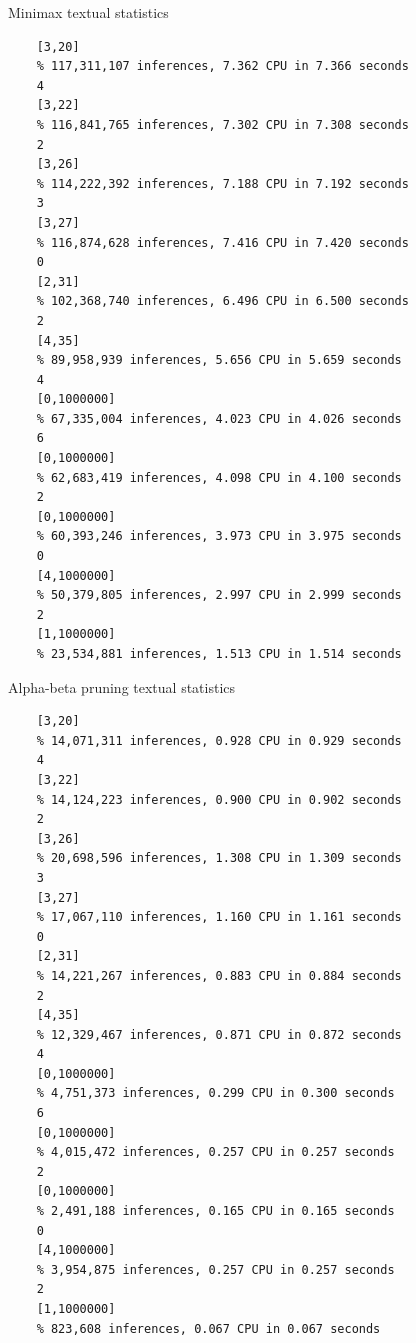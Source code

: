 \documentclass[11pt,a4paper]{article}
\begin{document}
Minimax textual statistics
\begin{verbatim}
    [3,20]
    % 117,311,107 inferences, 7.362 CPU in 7.366 seconds
    4
    [3,22]
    % 116,841,765 inferences, 7.302 CPU in 7.308 seconds
    2
    [3,26]
    % 114,222,392 inferences, 7.188 CPU in 7.192 seconds
    3
    [3,27]
    % 116,874,628 inferences, 7.416 CPU in 7.420 seconds
    0
    [2,31]
    % 102,368,740 inferences, 6.496 CPU in 6.500 seconds
    2
    [4,35]
    % 89,958,939 inferences, 5.656 CPU in 5.659 seconds
    4
    [0,1000000]
    % 67,335,004 inferences, 4.023 CPU in 4.026 seconds
    6
    [0,1000000]
    % 62,683,419 inferences, 4.098 CPU in 4.100 seconds
    2
    [0,1000000]
    % 60,393,246 inferences, 3.973 CPU in 3.975 seconds
    0
    [4,1000000]
    % 50,379,805 inferences, 2.997 CPU in 2.999 seconds
    2
    [1,1000000]
    % 23,534,881 inferences, 1.513 CPU in 1.514 seconds
\end{verbatim}

Alpha-beta pruning textual statistics
\begin{verbatim}
    [3,20]
    % 14,071,311 inferences, 0.928 CPU in 0.929 seconds
    4
    [3,22]
    % 14,124,223 inferences, 0.900 CPU in 0.902 seconds
    2
    [3,26]
    % 20,698,596 inferences, 1.308 CPU in 1.309 seconds
    3
    [3,27]
    % 17,067,110 inferences, 1.160 CPU in 1.161 seconds
    0
    [2,31]
    % 14,221,267 inferences, 0.883 CPU in 0.884 seconds
    2
    [4,35]
    % 12,329,467 inferences, 0.871 CPU in 0.872 seconds
    4
    [0,1000000]
    % 4,751,373 inferences, 0.299 CPU in 0.300 seconds
    6
    [0,1000000]
    % 4,015,472 inferences, 0.257 CPU in 0.257 seconds
    2
    [0,1000000]
    % 2,491,188 inferences, 0.165 CPU in 0.165 seconds
    0
    [4,1000000]
    % 3,954,875 inferences, 0.257 CPU in 0.257 seconds
    2
    [1,1000000]
    % 823,608 inferences, 0.067 CPU in 0.067 seconds
\end{verbatim}
\end{document}
